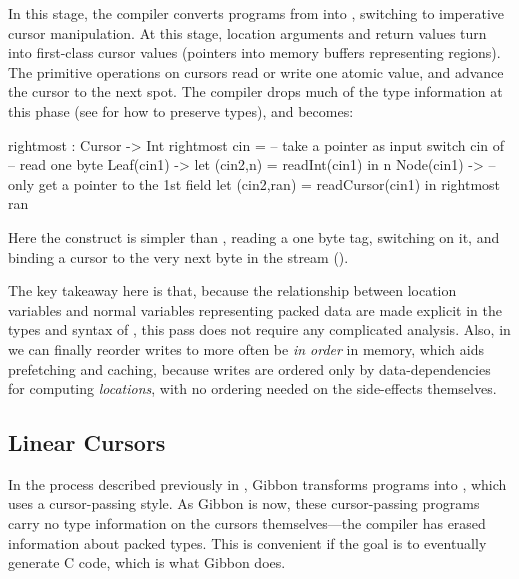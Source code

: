 In this stage, the compiler converts programs from \ourcalc{} into \lamcur{}, switching to
imperative cursor manipulation.
%
At this stage, location arguments and return values turn into first-class cursor
values (pointers into memory buffers representing regions).  The primitive
operations on cursors read or write one atomic value, and advance the cursor to
the next spot.  The compiler drops much of the type information at this phase (see  for how to preserve types), and
 becomes:
\begin{code}
rightmost : Cursor -> Int
rightmost cin =   -- take a pointer as input
  switch cin of   -- read one byte
    Leaf(cin1)  ->
      let (cin2,n) = readInt(cin1) in n
    Node(cin1)  -> -- only get a pointer to the 1st field
      let (cin2,ran) = readCursor(cin1) in
      rightmost ran
\end{code}\vspace{-1mm}
%
Here the  construct is simpler than ,
reading a one byte tag, switching on
it, and binding a cursor to the very next byte in the stream
().

%
The key takeaway here is that, because the relationship between
location variables and normal variables representing packed data are
made explicit in the types and syntax of \ourcalc{}, this pass
does not require any complicated analysis.
%
Also, in \lamcur{} we can finally reorder writes to more often be {\em in order}
in memory, which aids prefetching and caching,
because writes are ordered only by
data-dependencies for computing \emph{locations}, with no ordering needed
on the side-effects themselves.

\subsection{Linear Cursors}\label{subsec:linear}

In the process described previously in , Gibbon
transforms programs into \lamcur{}, which uses a cursor-passing style. As Gibbon
is now, these cursor-passing programs carry no type information on the cursors
themselves---the compiler has erased information about packed types. This is
convenient if the goal is to eventually generate C code, which is what Gibbon
does.


